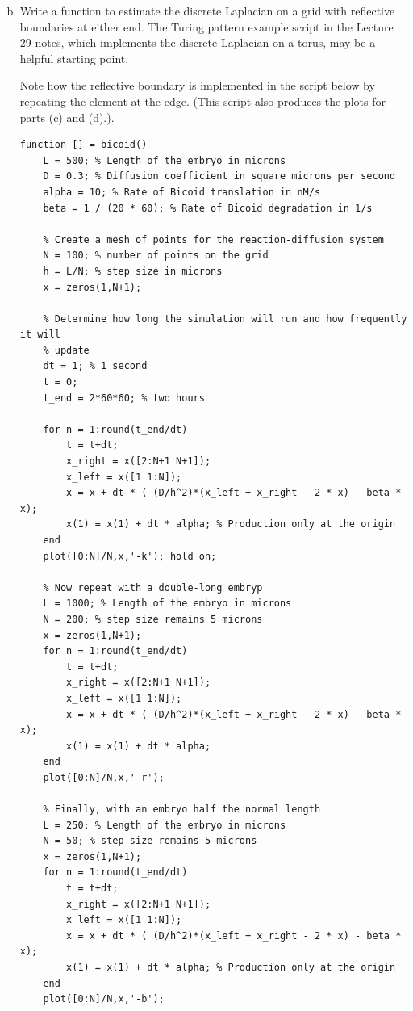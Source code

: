 \documentclass{article}
\begin{document}
\begin{enumerate}[a)]
\setcounter{enumi}{1}
\item Write a function to estimate the discrete Laplacian on a grid with reflective boundaries at either end. The Turing pattern example script in the Lecture 29 notes, which implements the discrete Laplacian on a torus, may be a helpful starting point.

{\color{red}
Note how the reflective boundary is implemented in the script below by repeating the element at the edge. (This script also produces the plots for parts (c) and (d).).
}

\begin{lstlisting}
function [] = bicoid()
    L = 500; % Length of the embryo in microns
    D = 0.3; % Diffusion coefficient in square microns per second
    alpha = 10; % Rate of Bicoid translation in nM/s
    beta = 1 / (20 * 60); % Rate of Bicoid degradation in 1/s
    
    % Create a mesh of points for the reaction-diffusion system
    N = 100; % number of points on the grid
    h = L/N; % step size in microns
    x = zeros(1,N+1);
    
    % Determine how long the simulation will run and how frequently it will
    % update
    dt = 1; % 1 second
    t = 0;
    t_end = 2*60*60; % two hours
    
    for n = 1:round(t_end/dt)
        t = t+dt;
        x_right = x([2:N+1 N+1]);
        x_left = x([1 1:N]);
        x = x + dt * ( (D/h^2)*(x_left + x_right - 2 * x) - beta * x);
        x(1) = x(1) + dt * alpha; % Production only at the origin
    end
    plot([0:N]/N,x,'-k'); hold on;
    
    % Now repeat with a double-long embryp
    L = 1000; % Length of the embryo in microns
    N = 200; % step size remains 5 microns
    x = zeros(1,N+1);   
    for n = 1:round(t_end/dt)
        t = t+dt;
        x_right = x([2:N+1 N+1]);
        x_left = x([1 1:N]);
        x = x + dt * ( (D/h^2)*(x_left + x_right - 2 * x) - beta * x);
        x(1) = x(1) + dt * alpha;
    end
    plot([0:N]/N,x,'-r');
    
    % Finally, with an embryo half the normal length
    L = 250; % Length of the embryo in microns
    N = 50; % step size remains 5 microns
    x = zeros(1,N+1);
    for n = 1:round(t_end/dt)
        t = t+dt;
        x_right = x([2:N+1 N+1]);
        x_left = x([1 1:N]);
        x = x + dt * ( (D/h^2)*(x_left + x_right - 2 * x) - beta * x);
        x(1) = x(1) + dt * alpha; % Production only at the origin
    end
    plot([0:N]/N,x,'-b');
    

\end{lstlisting}
\end{enumerate}
\end{document}
